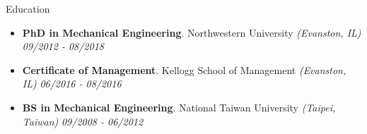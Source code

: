 \documentclass{resume} %
\begin{document}
	
	
	\begin{rSection}{Education}
		\begin{itemize}[leftmargin=0em]
			\item {\bf PhD in Mechanical Engineering}{. Northwestern University} \textit{(Evanston, IL)} \hfill {\em 09/2012 - 08/2018} 
			\vspace{-0mm}
			\item {\bf Certificate of Management}{. Kellogg School of Management} \textit{(Evanston, IL)} \hfill {\em 06/2016 - 08/2016} 
			\vspace{-0mm}
			\item {\bf BS in Mechanical Engineering}{. National Taiwan University} \textit{(Taipei, Taiwan)} \hfill {\em 09/2008 - 06/2012} 
			\vspace{-0mm}
		\end{itemize}
		
		
		
		
		
	\end{rSection}
	
	
	
	
	
	
\end{document}
